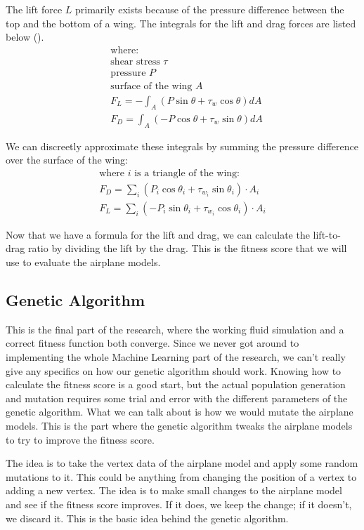 \documentclass[a4paper,12pt,titlepage]{article}
\begin{document}
The lift force $L$ primarily exists because of the pressure difference between
the top and the bottom of a wing. The integrals for the lift and drag forces are
listed below (\cite{liftdrag}).
\[
	\begin{aligned}
		& \text{where:} \\
		& \text{shear stress } \tau \\
		& \text{pressure } P \\
		& \text{surface of the wing } A \\
		& F_L = -\int_A (P \sin \theta + \tau_w \cos \theta) dA \\
		& F_D = \int_A (-P \cos \theta + \tau_w \sin \theta) dA
	\end{aligned}
\]


We can discreetly approximate these integrals by summing the pressure difference
over the surface of the wing:
\[
	\begin{array}{l}
		\text{where $i$ is a triangle of the wing:} \\
		F_D = \sum\limits_i (P_i \cos \theta_i + \tau_{w_i} \sin \theta_i) \cdot A_i \\
		F_L = \sum\limits_i (-P_i \sin \theta_i + \tau_{w_i} \cos \theta_i) \cdot A_i
	\end{array}
\]

Now that we have a formula for the lift and drag, we can calculate the lift-to-drag
ratio by dividing the lift by the drag. This is the fitness score that we will
use to evaluate the airplane models.

\subsection{Genetic Algorithm} \label{genalg}
This is the final part of the research, where the working fluid simulation and a
correct fitness function both converge. Since we never got around to implementing
the whole Machine Learning part of the research, we can't really give any specifics
on how our genetic algorithm should work. Knowing how to calculate the fitness
score is a good start, but the actual population generation and mutation requires
some trial and error with the different parameters of the genetic algorithm.
What we can talk about is how we would mutate the airplane models. This is the
part where the genetic algorithm tweaks the airplane models to try to improve
the fitness score.

The idea is to take the vertex data of the airplane model and apply some random
mutations to it. This could be anything from changing the position of a vertex
to adding a new vertex. The idea is to make small changes to the airplane model
and see if the fitness score improves. If it does, we keep the change; if it
doesn't, we discard it. This is the basic idea behind the genetic algorithm.
\end{document}
